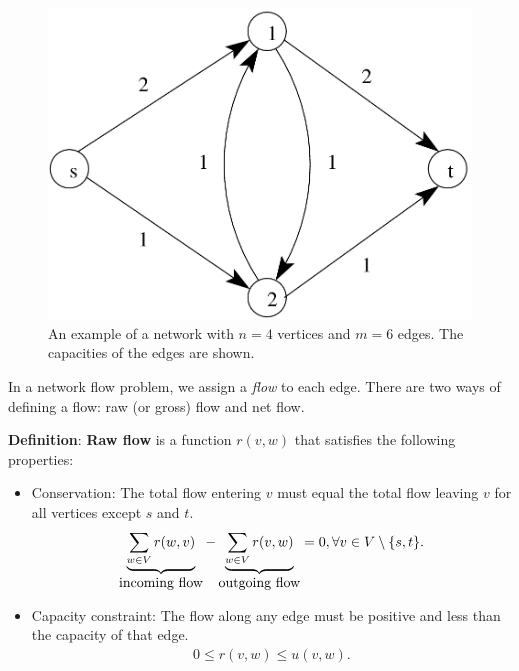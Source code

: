 \documentclass{article}
\begin{document}
\begin{figure}[h]
\begin{center}
  \includegraphics{ex_network.png}
  \caption{An example of a network with $n=4$ vertices and $m=6$ edges. The
  capacities of the edges are shown.}
\label{fig:ex_network}
\end{center}
\end{figure}


In a network flow problem, we assign a {\em flow} to each edge.  There are
two ways of defining a flow: raw (or gross) flow and net flow.

\textbf{Definition}:
\textbf{Raw flow} is a function $r(v,w)$ that satisfies the following properties:   
\begin{itemize}
  \item
    Conservation:  The total flow entering $v$ must equal the total flow leaving 
$v$ for all vertices except $s$ and $t$.\\ 
    \begin{align*}
      \underbrace{\sum_{w\in V} r(w,v)}_{\hbox{incoming flow}}-\underbrace{\sum_{w\in V}r(v,w)}_{\hbox{outgoing flow}}=0, \forall v\in V\setminus \{s,t\}.
    \end{align*}
  \item 
    Capacity constraint: The flow along any edge must be
positive and less than the capacity of that edge.
    \begin{align*}
      0 \le r(v,w)\le u(v,w).
    \end{align*}
\end{itemize}
\end{document}
